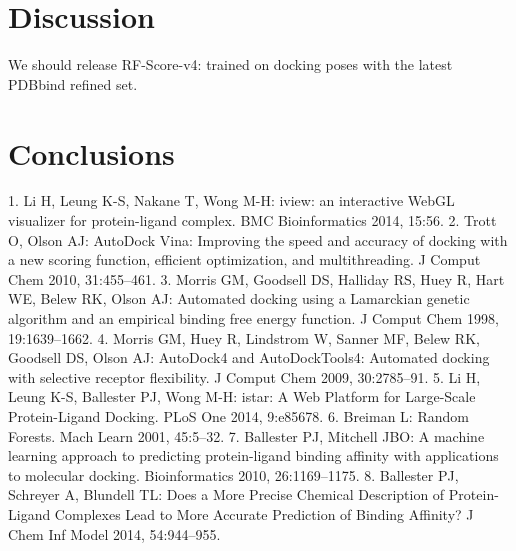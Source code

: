 \documentclass[twocolumn]{bmcart}
\begin{document}
\section*{Discussion}

We should release RF-Score-v4: trained on docking poses with the latest PDBbind refined set.

\section*{Conclusions}

1. Li H, Leung K-S, Nakane T, Wong M-H: iview: an interactive WebGL visualizer for protein-ligand complex. BMC Bioinformatics 2014, 15:56.
2. Trott O, Olson AJ: AutoDock Vina: Improving the speed and accuracy of docking with a new scoring function, efficient optimization, and multithreading. J Comput Chem 2010, 31:455–461.
3. Morris GM, Goodsell DS, Halliday RS, Huey R, Hart WE, Belew RK, Olson AJ: Automated docking using a Lamarckian genetic algorithm and an empirical binding free energy function. J Comput Chem 1998, 19:1639–1662.
4. Morris GM, Huey R, Lindstrom W, Sanner MF, Belew RK, Goodsell DS, Olson AJ: AutoDock4 and AutoDockTools4: Automated docking with selective receptor flexibility. J Comput Chem 2009, 30:2785–91.
5. Li H, Leung K-S, Ballester PJ, Wong M-H: istar: A Web Platform for Large-Scale Protein-Ligand Docking. PLoS One 2014, 9:e85678.
6. Breiman L: Random Forests. Mach Learn 2001, 45:5–32.
7. Ballester PJ, Mitchell JBO: A machine learning approach to predicting protein-ligand binding affinity with applications to molecular docking. Bioinformatics 2010, 26:1169–1175.
8. Ballester PJ, Schreyer A, Blundell TL: Does a More Precise Chemical Description of Protein-Ligand Complexes Lead to More Accurate Prediction of Binding Affinity? J Chem Inf Model 2014, 54:944–955. 

\end{document}
